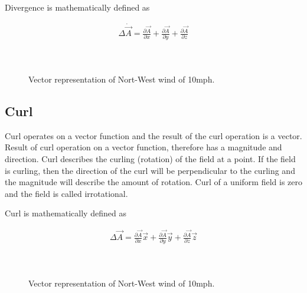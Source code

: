 Divergence is mathematically defined as

\begin{eqnarray}
\Delta \dot \vec{A} = \frac{\partial \vec{A}}{\partial x}  +\frac{\partial \vec{A}}{\partial y} +\frac{\partial \vec{A}}{\partial z} \\ \nonumber
\end{eqnarray}




\begin{figure}[htbp]
\begin{center}
\strut{} \\
\end{center}
\caption{Vector representation of Nort-West wind of 10mph.}
\label{flux}
\end{figure}



\subsection{Curl}




Curl operates on a vector function and the result of the curl operation is a vector. Result of curl operation on  a vector function, therefore has a magnitude and direction. Curl describes the curling (rotation) of the field at a point. If the field is curling, then the direction of the curl will be perpendicular to the curling and the magnitude will describe the amount of rotation. Curl of a uniform field is zero and the field is called irrotational.


Curl is mathematically defined as

\begin{eqnarray}
\Delta \vec{A} = \frac{\partial \vec{A}}{\partial x} \vec{x} +\frac{\partial \vec{A}}{\partial y} \vec{y} +\frac{\partial \vec{A}}{\partial z} \vec{z} \\ \nonumber
\end{eqnarray}





\begin{figure}[htbp]
\begin{center}
\strut{} \\
\end{center}
\caption{Vector representation of Nort-West wind of 10mph.}
\label{wind}
\end{figure}



